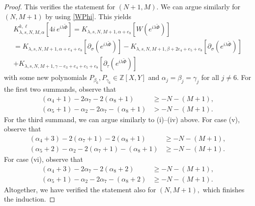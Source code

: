 \documentclass[10pt,a4paper]{amsart}
\newcommand{\Z}{\mathbb{Z}}
\begin{document}
\begin{proof}
This verifies the statement for $(N + 1,M)$. We can argue similarly for $(N,M + 1)$ by using \eqref{WPhi}. 
This yields
\begin{multline*}
 K_{\lambda,s,N,M,\alpha}^{k,\ell}[4i\,e^{i\lambda \tilde \Phi}]
 = K_{\lambda,s,N,M + 1,\alpha + e_8}[W(e^{i\lambda \tilde \Phi})] \\
 = K_{\lambda,s,N,M + 1,\alpha + e_ 4 + e_8}[\partial_\sigma(e^{i\lambda \tilde \Phi})]
-K_{\lambda,s,N,M + 1,\beta + 2e_ 4 + e_5 + e_8}[\partial_\sigma(e^{i\lambda \tilde \Phi})] \\
+ K_{\lambda,s,N,M + 1,\gamma - e_3 + e_ 4 + e_5 + e_8}[\partial_\tau(e^{i\lambda \tilde \Phi})]
\end{multline*}
with some new polynomials $P_{\beta_6},P_{\gamma_6}\in \Z[X,Y]$ and $\alpha_j = \beta_j = \gamma_j$ for all $j\neq 6$. For the first two summands, observe that
\begin{align*}
(\alpha_ 4 + 1)-2\alpha_7-2(\alpha_8 + 1) &\ge -N-(M + 1),\\
(\alpha_5 + 1)-\alpha_2-2\alpha_7-(\alpha_8 + 1) & > -N-(M + 1).
\end{align*}
For the third summand, we can argue similarly to (i)--(iv) above. For case (v), observe that
\begin{align*}
(\alpha_ 4 + 3)-2(\alpha_7 + 1)-2(\alpha_8 + 1) &\ge -N-(M + 1), \\
(\alpha_5 + 2)-\alpha_2-2(\alpha_7 + 1)-(\alpha_8 + 1) &\ge -N-(M + 1).
\end{align*}
For case (vi), observe that
\begin{align*}
(\alpha_ 4 + 3)-2\alpha_7-2(\alpha_8 + 2) &\ge -N-(M + 1), \\
(\alpha_5 + 1)-\alpha_2-2\alpha_7-(\alpha_8 + 2) &\ge -N-(M + 1).
\end{align*}
Altogether, we have verified the statement also for $(N,M+1),$ which  finishes the induction.
\end{proof}
\end{document}
